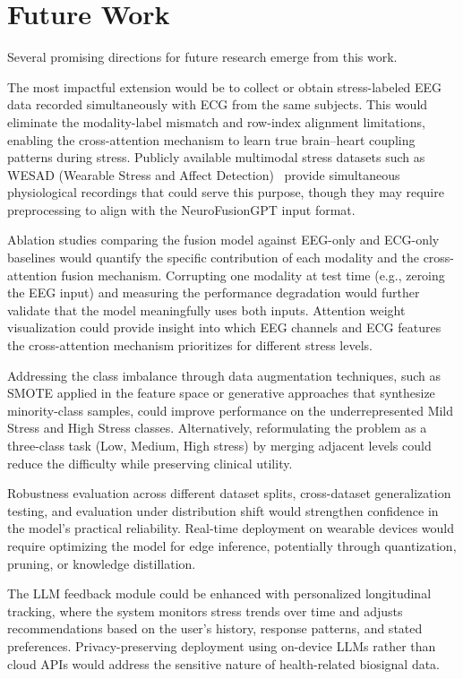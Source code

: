 \documentclass[12pt,letterpaper]{report}
\begin{document}
\section{Future Work}
\label{sec:future}

Several promising directions for future research emerge from this work.

The most impactful extension would be to collect or obtain stress-labeled EEG data recorded simultaneously with ECG from the same subjects. This would eliminate the modality-label mismatch and row-index alignment limitations, enabling the cross-attention mechanism to learn true brain--heart coupling patterns during stress. Publicly available multimodal stress datasets such as WESAD (Wearable Stress and Affect Detection)~\cite{schmidt2018} provide simultaneous physiological recordings that could serve this purpose, though they may require preprocessing to align with the NeuroFusionGPT input format.

Ablation studies comparing the fusion model against EEG-only and ECG-only baselines would quantify the specific contribution of each modality and the cross-attention fusion mechanism. Corrupting one modality at test time (e.g., zeroing the EEG input) and measuring the performance degradation would further validate that the model meaningfully uses both inputs. Attention weight visualization could provide insight into which EEG channels and ECG features the cross-attention mechanism prioritizes for different stress levels.

Addressing the class imbalance through data augmentation techniques, such as SMOTE applied in the feature space or generative approaches that synthesize minority-class samples, could improve performance on the underrepresented Mild Stress and High Stress classes. Alternatively, reformulating the problem as a three-class task (Low, Medium, High stress) by merging adjacent levels could reduce the difficulty while preserving clinical utility.

Robustness evaluation across different dataset splits, cross-dataset generalization testing, and evaluation under distribution shift would strengthen confidence in the model's practical reliability. Real-time deployment on wearable devices would require optimizing the model for edge inference, potentially through quantization, pruning, or knowledge distillation.

The LLM feedback module could be enhanced with personalized longitudinal tracking, where the system monitors stress trends over time and adjusts recommendations based on the user's history, response patterns, and stated preferences. Privacy-preserving deployment using on-device LLMs rather than cloud APIs would address the sensitive nature of health-related biosignal data.
\end{document}
